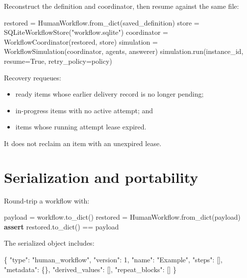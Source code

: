 \documentclass[
  10pt,
]{report}
\newenvironment{Shaded}{}{}
\newcommand{\ControlFlowTok}[1]{\textcolor[rgb]{0.00,0.44,0.13}{\textbf{#1}}}
\newcommand{\DataTypeTok}[1]{\textcolor[rgb]{0.56,0.13,0.00}{#1}}
\newcommand{\DecValTok}[1]{\textcolor[rgb]{0.25,0.63,0.44}{#1}}
\newcommand{\FunctionTok}[1]{\textcolor[rgb]{0.02,0.16,0.49}{#1}}
\newcommand{\NormalTok}[1]{#1}
\newcommand{\OperatorTok}[1]{\textcolor[rgb]{0.40,0.40,0.40}{#1}}
\newcommand{\OtherTok}[1]{\textcolor[rgb]{0.00,0.44,0.13}{#1}}
\newcommand{\StringTok}[1]{\textcolor[rgb]{0.25,0.44,0.63}{#1}}
\newcommand{\VariableTok}[1]{\textcolor[rgb]{0.10,0.09,0.49}{#1}}
\providecommand{\tightlist}{%
  \setlength{\itemsep}{0pt}\setlength{\parskip}{0pt}}
\begin{document}
Reconstruct the definition and coordinator, then resume against the same
file:

\begin{Shaded}
\begin{Highlighting}[]
\NormalTok{restored }\OperatorTok{=}\NormalTok{ HumanWorkflow.from\_dict(saved\_definition)}
\NormalTok{store }\OperatorTok{=}\NormalTok{ SQLiteWorkflowStore(}\StringTok{"workflow.sqlite"}\NormalTok{)}
\NormalTok{coordinator }\OperatorTok{=}\NormalTok{ WorkflowCoordinator(restored, store)}
\NormalTok{simulation }\OperatorTok{=}\NormalTok{ WorkflowSimulation(coordinator, agents, answerer)}
\NormalTok{simulation.run(instance\_id, resume}\OperatorTok{=}\VariableTok{True}\NormalTok{, retry\_policy}\OperatorTok{=}\NormalTok{policy)}
\end{Highlighting}
\end{Shaded}

Recovery requeues:

\begin{itemize}
\tightlist
\item
  ready items whose earlier delivery record is no longer pending;
\item
  in-progress items with no active attempt; and
\item
  items whose running attempt lease expired.
\end{itemize}

It does not reclaim an item with an unexpired lease.

\chapter{Serialization and
portability}\label{serialization-and-portability}

Round-trip a workflow with:

\begin{Shaded}
\begin{Highlighting}[]
\NormalTok{payload }\OperatorTok{=}\NormalTok{ workflow.to\_dict()}
\NormalTok{restored }\OperatorTok{=}\NormalTok{ HumanWorkflow.from\_dict(payload)}
\ControlFlowTok{assert}\NormalTok{ restored.to\_dict() }\OperatorTok{==}\NormalTok{ payload}
\end{Highlighting}
\end{Shaded}

The serialized object includes:

\begin{Shaded}
\begin{Highlighting}[]
\FunctionTok{\{}
  \DataTypeTok{"type"}\FunctionTok{:} \StringTok{"human\_workflow"}\FunctionTok{,}
  \DataTypeTok{"version"}\FunctionTok{:} \DecValTok{1}\FunctionTok{,}
  \DataTypeTok{"name"}\FunctionTok{:} \StringTok{"Example"}\FunctionTok{,}
  \DataTypeTok{"steps"}\FunctionTok{:} \OtherTok{[]}\FunctionTok{,}
  \DataTypeTok{"metadata"}\FunctionTok{:} \FunctionTok{\{\},}
  \DataTypeTok{"derived\_values"}\FunctionTok{:} \OtherTok{[]}\FunctionTok{,}
  \DataTypeTok{"repeat\_blocks"}\FunctionTok{:} \OtherTok{[]}
\FunctionTok{\}}
\end{Highlighting}
\end{Shaded}
\end{document}
